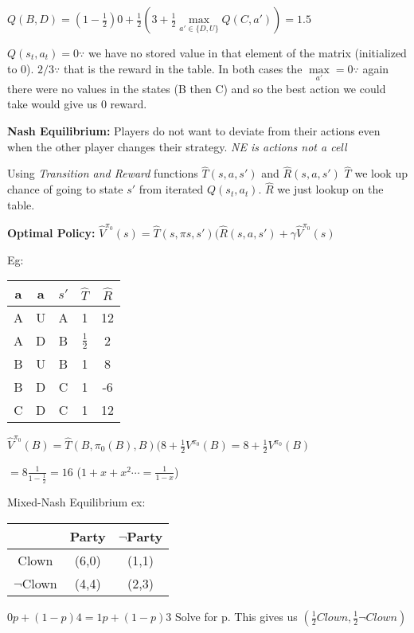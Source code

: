\documentclass[12pt,letter]{article}
\begin{document}
\begin{multicols}{2}
$Q(B,D) = (1-\frac12)0 + \frac12(3 + \frac12\max\limits_{a'\in\{D,U\}}Q(C,a'))=1.5$

$Q(s_t,a_t)=0\because$ we have no stored value in that element of the matrix
(initialized to 0). $2/3\because$ that is the reward in the table. In both
cases the $\max\limits_{a'}=0\because$ again there were no values in the states
(B then C) and so the best action we could take would give us $0$ reward. 

\textbf{Nash Equilibrium:} Players do not want to deviate from their actions even
when the other player changes their strategy. \textit{NE is actions not a cell}

Using \textit{Transition and Reward} functions $\hat{T}(s,a,s')$ and $\hat{R}(s,a,s')$
$\hat{T}$ we look up chance of going to state $s'$ from iterated $Q(s_t,a_t)$. 
$\hat{R}$ we just lookup on the table.

\textbf{Optimal Policy:}
$\hat{V}^{\pi_0}(s) = \hat{T}(s,\pi{s},s')(\hat{R}(s,a,s') + \gamma\hat{V}^{\pi_0}(s)$

Eg:

\begin{tabular}{|c|c|c|c|c|}
    \hline
    a & a & $s'$ & $\hat{T}$ & $\hat{R}$\\\hline
    A & U & A & 1 & 12\\\hline
    A & D & B & $\frac12$ & 2 \\\hline
    B & U & B & 1 & 8\\\hline
    B & D & C & 1 & -6\\\hline
    C & D & C & 1 & 12\\\hline
\end{tabular}

$\hat{V}^{\pi_0}(B) = \hat{T}(B,\pi_0(B),B)(8 + \frac12 V^{\pi_0}(B)=8 + \frac12 V^{\pi_0}(B)$ 

$= 8 \frac{1}{1-\frac12}=16$ ($1+x+x^2\cdots = \frac{1}{1-x}$)



Mixed-Nash Equilibrium ex:

\begin{tabular}{|c|c|c|}
    \hline
    & Party & $\neg$Party\\\hline
    Clown & (6,0) & (1,1)\\\hline
    $\neg$Clown & (4,4) & (2,3)\\\hline
\end{tabular}

$0p + (1-p)4 = 1p + (1-p)3$ Solve for p. This gives us $(\frac12 Clown,\frac12\neg Clown)$


\end{multicols}
\end{document}
